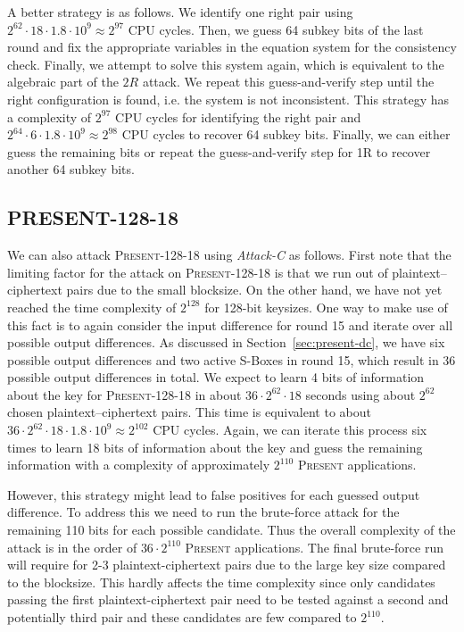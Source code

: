 \documentclass{llncs}
\newcommand{\PRESENT}{\textsc{Present}\xspace}
\begin{document}
A better strategy is as follows. We identify one right pair using 
$2^{62} \cdot 18 \cdot 1.8 \cdot 10^9 \approx 2^{97}$ CPU cycles. Then, we
guess 64 subkey bits of the last round and fix the appropriate variables in the
equation system for the consistency check. Finally, we attempt to solve this
system again, which is equivalent to the algebraic part of the $2R$ attack. We
repeat this guess-and-verify step until the right configuration is found,
i.e. the system is not inconsistent. This strategy has a complexity of $2^{97}$
CPU cycles for identifying the right pair and $2^{64} \cdot 6 \cdot 1.8 \cdot
10^9 \approx 2^{98}$ CPU cycles to recover 64 subkey bits. Finally, we can
either guess the remaining bits or repeat the guess-and-verify step for 1R to
recover another 64 subkey bits.

\subsection{PRESENT-128-18}
We can also attack \PRESENT-128-18 using \emph{Attack-C} as follows.
First note that the limiting factor for the attack on \PRESENT-128-18 is that we
run out of plaintext--ciphertext pairs due to the small blocksize. On the other
hand, we have not yet reached the time complexity of $2^{128}$ for 128-bit
keysizes. One way to make use of this fact is to again consider the input
difference for round 15 and iterate over all possible output differences.
As discussed in Section~\ref{sec:present-dc}, we have six possible output
differences and two active S-Boxes in round 15, which result in 36 possible
output differences in total. We expect to learn 4 bits of information about the
key for \PRESENT-128-18 in about $36 \cdot 2^{62} \cdot 18$
seconds using about $2^{62}$ chosen plaintext--ciphertext
pairs. This time is equivalent to about $36 \cdot 2^{62}
\cdot 18 \cdot 1.8 \cdot 10^9 \approx 2^{102}$ CPU cycles. Again, we can
iterate this process six times to learn 18 bits of information about the key and
guess the remaining information with a complexity of approximately $2^{110}$
\PRESENT applications.

However, this strategy might lead to false positives for each guessed output
difference. To address this we need to run the brute-force attack
for the remaining 110 bits for each possible candidate. Thus the overall
complexity of the attack is in the order of $36 \cdot 2^{110}$ \PRESENT
applications. The final brute-force run will require for 2-3
plaintext-ciphertext pairs due to the large key size compared to the blocksize.
This hardly affects the time complexity since only candidates passing the first
plaintext-ciphertext pair need to be tested against a second and potentially
third pair and these candidates are few compared to $2^{110}$. 
\end{document}
